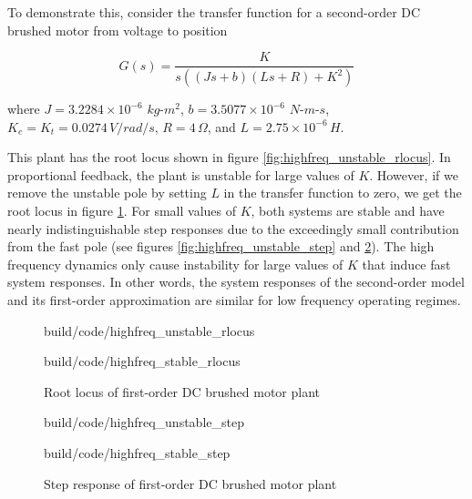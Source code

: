 To demonstrate this, consider the transfer function for a second-order DC
brushed motor from voltage to position

\begin{equation*}
  G(s) = \frac{K}{s((Js + b)(Ls + R) + K^2)}
\end{equation*}

where $J = 3.2284 \times 10^{-6}$ $kg$-$m^2$, $b = 3.5077 \times 10^{-6}$
$N$-$m$-$s$, $K_e = K_t = 0.0274 \,V/rad/s$, $R = 4 \,\Omega$, and
$L = 2.75 \times 10^{-6} \,H$.

This plant has the root locus shown in figure
\ref{fig:highfreq_unstable_rlocus}. In proportional feedback, the plant is
unstable for large values of $K$. However, if we remove the unstable pole by
setting $L$ in the transfer function to zero, we get the root locus in figure
\ref{fig:highfreq_stable_rlocus}. For small values of $K$, both systems are
stable and have nearly indistinguishable step responses due to the exceedingly
small contribution from the fast pole (see figures
\ref{fig:highfreq_unstable_step} and \ref{fig:highfreq_stable_step}). The high
frequency dynamics only cause instability for large values of $K$ that induce
fast system responses. In other words, the system responses of the second-order
model and its first-order approximation are similar for low frequency operating
regimes.

\begin{figure}
  \begin{minisvg}{build/code/highfreq_unstable_rlocus}
    \caption{Root locus of second-order DC brushed motor plant}
    \label{fig:highfreq_unstable_rlocus}
  \end{minisvg}
  \begin{minisvg}{build/code/highfreq_stable_rlocus}
    \caption{Root locus of first-order DC brushed motor plant}
    \label{fig:highfreq_stable_rlocus}
  \end{minisvg}
\end{figure}

\begin{figure}
  \begin{minisvg}{build/code/highfreq_unstable_step}
    \caption{Step response of second-order DC brushed motor plant}
    \label{fig:highfreq_unstable_step}
  \end{minisvg}
  \begin{minisvg}{build/code/highfreq_stable_step}
    \caption{Step response of first-order DC brushed motor plant}
    \label{fig:highfreq_stable_step}
  \end{minisvg}
\end{figure}

